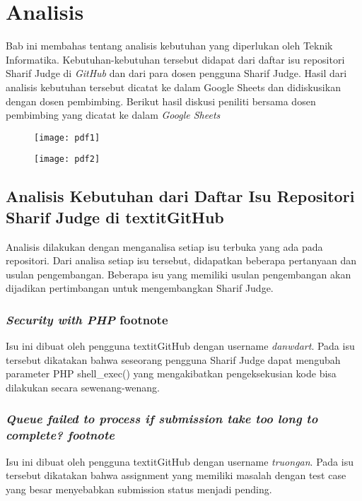 \chapter{Analisis}
\label{chap:analisis}

Bab ini membahas tentang analisis kebutuhan yang diperlukan oleh Teknik Informatika. Kebutuhan-kebutuhan tersebut didapat dari daftar isu repositori Sharif Judge di \textit{GitHub} dan dari para dosen pengguna Sharif Judge. Hasil dari analisis kebutuhan tersebut dicatat ke dalam Google Sheets dan didiskusikan dengan dosen pembimbing. Berikut hasil diskusi peniliti bersama dosen pembimbing yang dicatat ke dalam \textit{Google Sheets}

\begin{figure}[H]
	\centering  
	\texttt{[image: pdf1]}
	
	\texttt{[image: pdf2]}
\end{figure}

\section{Analisis Kebutuhan dari Daftar Isu Repositori Sharif Judge di textit{GitHub}}
\label{sec:analisisgithub} 
Analisis dilakukan dengan menganalisa setiap isu terbuka yang ada pada repositori. Dari analisa setiap isu tersebut, didapatkan beberapa pertanyaan dan usulan pengembangan. Beberapa isu yang memiliki usulan pengembangan akan dijadikan pertimbangan untuk mengembangkan Sharif Judge.

\subsection{\textit{Security with PHP} footnote}
Isu ini dibuat oleh pengguna textit{GitHub} dengan username \textit{danwdart}. Pada isu tersebut dikatakan bahwa seseorang pengguna Sharif Judge dapat mengubah parameter PHP shell\_exec() yang mengakibatkan pengeksekusian kode bisa dilakukan secara sewenang-wenang. %
	
\subsection{\textit{Queue failed to process if submission take too long to complete? footnote}}
Isu ini dibuat oleh pengguna textit{GitHub} dengan username \textit{truongan}. Pada isu tersebut dikatakan bahwa assignment yang memiliki masalah dengan test case yang besar menyebabkan submission status menjadi pending. %

